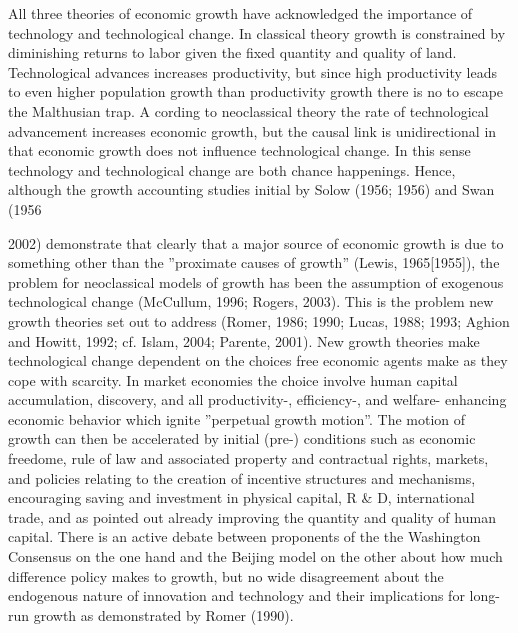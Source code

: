 \documentclass[11pt]{article}
\begin{document}
All three theories of economic growth have acknowledged the importance of technology and technological change. In classical theory growth is constrained by diminishing returns to labor given the fixed quantity and quality of land. Technological advances increases productivity, but since high productivity leads to even higher population growth than productivity growth there is no to escape the Malthusian trap. A cording to neoclassical theory the rate of technological advancement increases economic growth, but the causal link is unidirectional in that economic growth does not influence technological change. In this sense technology and technological change are both chance happenings. Hence, although the growth accounting studies initial by Solow (1956; 1956) and Swan (1956{2002) demonstrate that clearly that a major source of economic growth is due to something other than the ''proximate causes of growth'' (Lewis, 1965[1955]), the problem for neoclassical models of growth has been the assumption of exogenous technological change (McCullum, 1996; Rogers, 2003). This is the problem new growth theories set out to address (Romer, 1986; 1990; Lucas, 1988; 1993; Aghion and Howitt, 1992; cf. Islam, 2004; Parente, 2001). New growth theories make technological change dependent on the choices free economic agents make as they cope with scarcity. In market economies the choice involve human capital accumulation, discovery, and all productivity-, efficiency-, and welfare- enhancing economic behavior which ignite ''perpetual growth motion''. The motion of growth can then be accelerated by initial (pre-) conditions such as economic freedome, rule of law and associated property and contractual rights, markets, and policies relating to the creation of incentive structures and mechanisms, encouraging saving and investment in physical capital, R \& D, international trade, and as pointed out already improving the quantity and quality of human capital. There is an active debate between proponents of the the Washington Consensus on the one hand and the Beijing model on the other about how much difference policy makes to growth, but no wide disagreement about the endogenous nature of innovation and technology and their implications for long-run growth as demonstrated by Romer (1990). 

}
\end{document}
